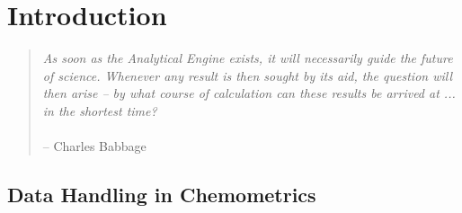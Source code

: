
\chapter{Introduction}

\begin{quote}
{\it
  As soon as the Analytical Engine exists, it will necessarily guide the
  future of science. Whenever any result is then sought by its aid, the
  question will then arise -- by what course of calculation can these
  results be arrived at ... in the shortest time?}
\\\\
 -- Charles Babbage
\end{quote}

\section{Data Handling in Chemometrics}


